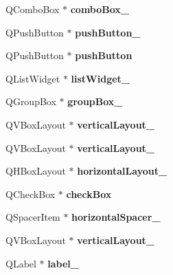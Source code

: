 \begin{DoxyCompactItemize}
Q\+Combo\+Box $\ast$ {\bfseries combo\+Box\+\_}
\item 
\mbox{\label{classUi__Widget_a9fe3d756fb7f6586b7d1155b4234b409}} 
Q\+Push\+Button $\ast$ {\bfseries push\+Button\+\_}
\item 
\mbox{\label{classUi__Widget_a7dcf5da8902069415662905e93b0d5cb}} 
Q\+Push\+Button $\ast$ {\bfseries push\+Button}
\item 
\mbox{\label{classUi__Widget_a87fe924e6521457cf4b4037a90e4391e}} 
Q\+List\+Widget $\ast$ {\bfseries list\+Widget\+\_}
\item 
\mbox{\label{classUi__Widget_ac164b5fb7882f7943de7a8e441487a61}} 
Q\+Group\+Box $\ast$ {\bfseries group\+Box\+\_}
\item 
\mbox{\label{classUi__Widget_a90545715035df9aa4149b1a774849e91}} 
Q\+V\+Box\+Layout $\ast$ {\bfseries vertical\+Layout\+\_}
\item 
\mbox{\label{classUi__Widget_a01e6301cf5bdb8a01d3ccd14721aa5e9}} 
Q\+V\+Box\+Layout $\ast$ {\bfseries vertical\+Layout\+\_}
\item 
\mbox{\label{classUi__Widget_aff49ef24d25c8f32f5f6c8be4ef321f3}} 
Q\+H\+Box\+Layout $\ast$ {\bfseries horizontal\+Layout\+\_}
\item 
\mbox{\label{classUi__Widget_a35f4e9e8ef620a71db2cb97b4e1bce11}} 
Q\+Check\+Box $\ast$ {\bfseries check\+Box}
\item 
\mbox{\label{classUi__Widget_adc4d7dca75c3ae15e5d77b1b5ae5f628}} 
Q\+Spacer\+Item $\ast$ {\bfseries horizontal\+Spacer\+\_}
\item 
\mbox{\label{classUi__Widget_a6392782f473ce8ac16bf72cd2378c7b0}} 
Q\+V\+Box\+Layout $\ast$ {\bfseries vertical\+Layout\+\_}
\item 
\mbox{\label{classUi__Widget_ac91adba0502c44722a84d05f1ebda6c5}} 
Q\+Label $\ast$ {\bfseries label\+\_}
\item 

\end{DoxyCompactItemize}
